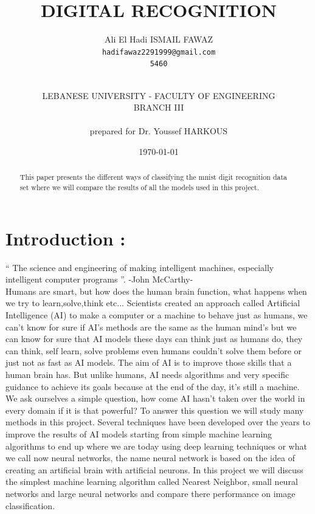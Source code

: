 \documentclass[10pt,a4paper]{article}
\author{Ali El Hadi ISMAIL FAWAZ\\
\texttt{hadifawaz2291999@gmail.com}\\
\texttt{5460}\\\\
\and
LEBANESE UNIVERSITY - FACULTY OF ENGINEERING\\
BRANCH III\\\\
\small prepared for Dr. Youssef HARKOUS}
\date{\today}
\title{\myfont DIGITAL RECOGNITION}
\begin{document}
\maketitle
\titlepage
\tableofcontents
\newpage
\listoffigures
\newpage
\begin{abstract}
This paper presents the different ways of classifying the mnist digit recognition data set where we will compare the results of all the models used in this project.
\end{abstract}

\section{Introduction :}
\large “ The science and engineering of making intelligent machines, especially intelligent computer programs ”. -John McCarthy-\\
Humans are smart, but how does the human brain function, what happens when we try to learn,solve,think etc... Scientists created an approach called Artificial Intelligence (AI) to make a computer or a machine to behave just as humans, we can't know for sure if AI's methods are the same as the human mind's but we can know for sure that AI models these days can think just as humans do, they can think, self learn, solve problems even humans couldn't solve them before or just not as fast as AI models. The aim of AI is to improve those skills that a human brain has. But unlike humans, AI needs algorithms and very specific guidance to achieve its goals because at the end of the day, it's still a machine.\\
We ask ourselves a simple question, how come AI hasn't taken over the world in every domain if it is that powerful? To answer this question we will study many methods in this project. Several techniques have been developed over the years to improve the results of AI models starting from simple machine learning algorithms to end up where we are today using deep learning techniques or what we call now neural networks, the name neural network is based on the idea of creating an artificial brain with artificial neurons. In this project we will discuss the simplest machine learning algorithm called Nearest Neighbor, small neural networks and large neural networks and compare there performance on image classification.
\end{document}
